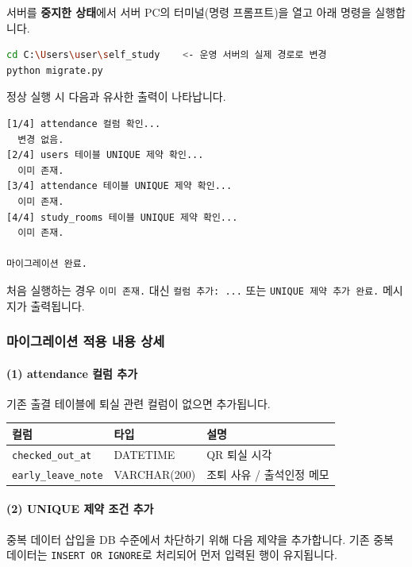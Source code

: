 \documentclass[a4paper,12pt]{article}
\begin{document}
서버를 \textbf{중지한 상태}에서 서버 PC의 터미널(명령 프롬프트)을 열고 아래 명령을 실행합니다.

\begin{lstlisting}[language=bash, caption=마이그레이션 실행]
cd C:\Users\user\self_study    <- 운영 서버의 실제 경로로 변경
python migrate.py
\end{lstlisting}

정상 실행 시 다음과 유사한 출력이 나타납니다.

\begin{lstlisting}
[1/4] attendance 컬럼 확인...
  변경 없음.
[2/4] users 테이블 UNIQUE 제약 확인...
  이미 존재.
[3/4] attendance 테이블 UNIQUE 제약 확인...
  이미 존재.
[4/4] study_rooms 테이블 UNIQUE 제약 확인...
  이미 존재.

마이그레이션 완료.
\end{lstlisting}

처음 실행하는 경우 \texttt{이미 존재.} 대신 \texttt{컬럼 추가: ...} 또는 \texttt{UNIQUE 제약 추가 완료.} 메시지가 출력됩니다.

\subsubsection*{마이그레이션 적용 내용 상세}

\paragraph{(1) attendance 컬럼 추가}

기존 출결 테이블에 퇴실 관련 컬럼이 없으면 추가됩니다.

\begin{center}
\begin{tabularx}{\textwidth}{llX}
\toprule
\textbf{컬럼} & \textbf{타입} & \textbf{설명} \\
\midrule
\texttt{checked\_out\_at} & DATETIME & QR 퇴실 시각 \\
\texttt{early\_leave\_note} & VARCHAR(200) & 조퇴 사유 / 출석인정 메모 \\
\bottomrule
\end{tabularx}
\end{center}

\paragraph{(2) UNIQUE 제약 조건 추가}

중복 데이터 삽입을 DB 수준에서 차단하기 위해 다음 제약을 추가합니다.
기존 중복 데이터는 \texttt{INSERT OR IGNORE}로 처리되어 먼저 입력된 행이 유지됩니다.
\end{document}
